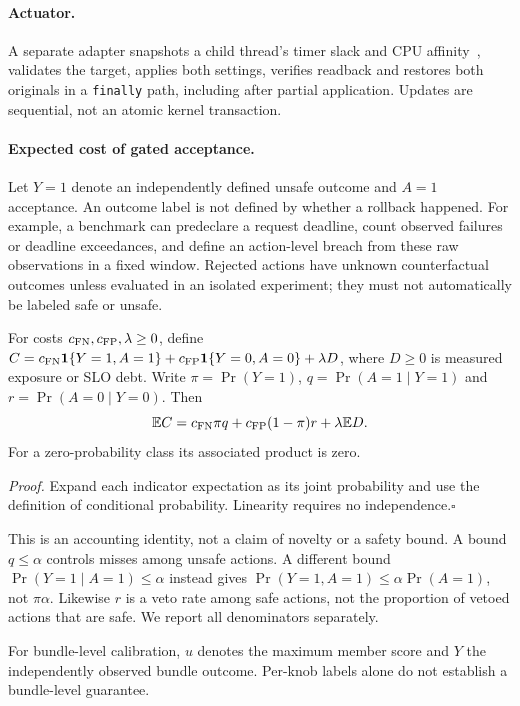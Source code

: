 \paragraph{Actuator.}
A separate adapter snapshots a child thread's timer slack and CPU affinity~\cite{LinuxTimerSlack,LinuxAffinity}, validates the target, applies both settings, verifies readback and restores both originals in a \texttt{finally} path, including after partial application. Updates are sequential, not an atomic kernel transaction.

\paragraph{Expected cost of gated acceptance.}
Let $Y=1$ denote an independently defined unsafe outcome and $A=1$ acceptance. An outcome label is not defined by whether a rollback happened. For example, a benchmark can predeclare a request deadline, count observed failures or deadline exceedances, and define an action-level breach from these raw observations in a fixed window. Rejected actions have unknown counterfactual outcomes unless evaluated in an isolated experiment; they must not automatically be labeled safe or unsafe.

\begin{theorem}\label{thm:pac-cost}
For costs $c_{\rm FN},c_{\rm FP},\lambda\ge0$, define
$C=c_{\rm FN}\mathbf{1}\{Y=1,A=1\}+c_{\rm FP}\mathbf{1}\{Y=0,A=0\}+\lambda D$,
where $D\ge0$ is measured exposure or SLO debt. Write $\pi=\Pr(Y=1)$,
$q=\Pr(A=1\mid Y=1)$ and $r=\Pr(A=0\mid Y=0)$. Then
\[
\mathbb{E}C=c_{\rm FN}\pi q+c_{\rm FP}(1-\pi)r+\lambda\mathbb{E}D.
\]
For a zero-probability class its associated product is zero.
\end{theorem}
\noindent\emph{Proof.} Expand each indicator expectation as its joint probability and use the definition of conditional probability. Linearity requires no independence.\hfill$\square$

This is an accounting identity, not a claim of novelty or a safety bound. A bound $q\le\alpha$ controls misses among unsafe actions. A different bound $\Pr(Y=1\mid A=1)\le\alpha$ instead gives
$\Pr(Y=1,A=1)\le\alpha\Pr(A=1)$, not $\pi\alpha$. Likewise $r$ is a veto rate among safe actions, not the proportion of vetoed actions that are safe. We report all denominators separately.

For bundle-level calibration, $u$ denotes the maximum member score and $Y$ the independently observed bundle outcome. Per-knob labels alone do not establish a bundle-level guarantee.

